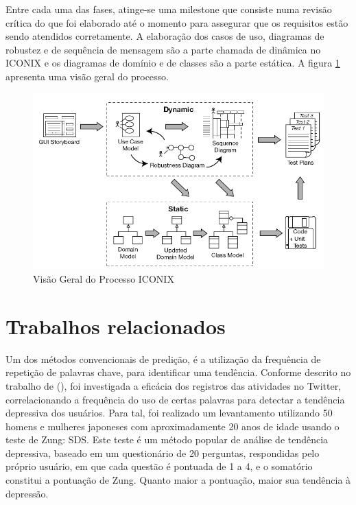 \documentclass[
	12pt,				%
	openright,			%
	oneside,			%
	a4paper,			%
	english,			%
	spanish,			%
	brazil				%
	]{abntex2}
\begin{document}
	Entre cada uma das fases, atinge-se uma milestone que consiste numa revisão crítica do que foi elaborado até o momento para assegurar que os requisitos estão sendo atendidos corretamente. A elaboração dos casos de uso, diagramas de robustez e de sequência de mensagem são a parte chamada de dinâmica no ICONIX e os diagramas de domínio e de classes são a parte estática. A figura \ref{iconix_diagram} apresenta uma visão geral do processo.
	
\begin{figure}[H]
\centering
\includegraphics[scale=0.5]{iconix}
\caption{Visão Geral do Processo ICONIX \cite{iconix}}
\label{iconix_diagram}
\end{figure}

\section{Trabalhos relacionados}

	Um dos métodos convencionais de predição, é a utilização da frequência de repetição de palavras chave, para identificar uma tendência. Conforme descrito no trabalho de  (\citeyear{article_Tsugawa2013}), foi investigada a eficácia dos registros das atividades no Twitter, correlacionando a frequência do uso de certas palavras para detectar a tendência depressiva dos usuários. Para tal, foi realizado um levantamento utilizando 50 homens e mulheres japoneses com aproximadamente 20 anos de idade usando o teste de Zung: \gls{SDS}. Este teste é um método popular de análise de tendência depressiva, baseado em um questionário de 20 perguntas, respondidas pelo próprio usuário, em que cada questão é pontuada de 1 a 4, e o somatório constitui a pontuação de Zung. Quanto maior a pontuação, maior sua tendência à depressão. 
	
\end{document}
